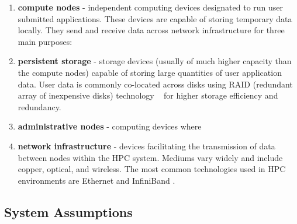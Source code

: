 \documentclass{llncs}
\begin{document}
\begin{enumerate} \itemsep1pt \parskip0pt 
\item \textbf{compute nodes} - independent computing devices designated to run user submitted applications. These devices are capable of storing temporary data locally. They send and receive data across network infrastructure for three main purposes:
\item \textbf{persistent storage} - storage devices (usually of much higher capacity than the compute nodes) capable of storing large quantities of user application data. User data is commonly co-located across disks using RAID (redundant array of inexpensive disks) technology ~\cite{katz1989disk} for higher storage efficiency and redundancy. 
\item \textbf{administrative nodes} - computing devices where 
\item \textbf{network infrastructure} - devices facilitating the transmission of data between nodes within the HPC system. Mediums vary widely and include copper, optical, and wireless. The most common technologies used in HPC environments are Ethernet and InfiniBand \cite{bozzo2006design}\cite{madai2010performance}. 
\end{enumerate}
\subsection{System Assumptions}
\end{document}
